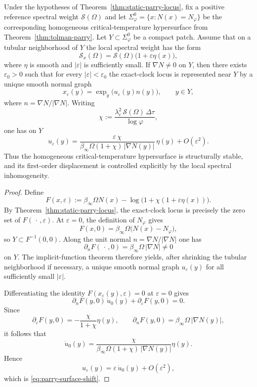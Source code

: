 \begin{theorem}\label{thm:parry-surface-stability}
Under the hypotheses of Theorem~\ref{thm:static-parry-locus}, fix a positive reference spectral weight $\mathcal S(\Omega)$ and let $\Sigma_\varphi^0=\{x:N(x)=N_\varphi\}$ be the corresponding homogeneous critical-temperature hypersurface from Theorem~\ref{thm:tolman-parry}. Let $Y\subset\Sigma_\varphi^0$ be a compact patch. Assume that on a tubular neighborhood of $Y$ the local spectral weight has the form
\[
\mathcal S_x(\Omega)
=
\mathcal S(\Omega)\bigl(1+\varepsilon\eta(x)\bigr),
\]
where $\eta$ is smooth and $|\varepsilon|$ is sufficiently small. If $\nabla N\neq 0$ on $Y$, then there exists $\varepsilon_0>0$ such that for every $|\varepsilon|<\varepsilon_0$ the exact-clock locus is represented near $Y$ by a unique smooth normal graph
\[
x_\varepsilon(y)=\exp_y\bigl(u_\varepsilon(y)n(y)\bigr),
\qquad
y\in Y,
\]
where $n=\nabla N/|\nabla N|$. Writing
\[
\chi
:=
\frac{\lambda_c^2\,\mathcal S(\Omega)\,\Delta\tau}{\log\varphi},
\]
one has on $Y$
\begin{equation}\label{eq:parry-surface-shift}
u_\varepsilon(y)
=
\frac{\varepsilon\,\chi}{\beta_\infty\Omega(1+\chi)\,|\nabla N(y)|}\,
\eta(y)
+
O(\varepsilon^2).
\end{equation}
Thus the homogeneous critical-temperature hypersurface is structurally stable, and its first-order displacement is controlled explicitly by the local spectral inhomogeneity.
\end{theorem}

\begin{proof}
Define
\[
F(x,\varepsilon)
:=
\beta_\infty\Omega N(x)
-
\log\!\bigl(1+\chi(1+\varepsilon\eta(x))\bigr).
\]
By Theorem~\ref{thm:static-parry-locus}, the exact-clock locus is precisely the zero set of $F(\,\cdot\,,\varepsilon)$. At $\varepsilon=0$, the definition of $N_\varphi$ gives
\[
F(x,0)
=
\beta_\infty\Omega\bigl(N(x)-N_\varphi\bigr),
\]
so $Y\subset F^{-1}(0,0)$. Along the unit normal $n=\nabla N/|\nabla N|$ one has
\[
\partial_nF(\,\cdot\,,0)
=
\beta_\infty\Omega\,|\nabla N|
\neq
0
\]
on $Y$. The implicit-function theorem therefore yields, after shrinking the tubular neighborhood if necessary, a unique smooth normal graph $u_\varepsilon(y)$ for all sufficiently small $|\varepsilon|$.

Differentiating the identity $F(x_\varepsilon(y),\varepsilon)=0$ at $\varepsilon=0$ gives
\[
\partial_nF(y,0)\,\dot u_0(y)
+
\partial_\varepsilon F(y,0)
=
0.
\]
Since
\[
\partial_\varepsilon F(y,0)
=
-\frac{\chi}{1+\chi}\eta(y),
\qquad
\partial_nF(y,0)
=
\beta_\infty\Omega\,|\nabla N(y)|,
\]
it follows that
\[
\dot u_0(y)
=
\frac{\chi}{\beta_\infty\Omega(1+\chi)\,|\nabla N(y)|}\eta(y).
\]
Hence
\[
u_\varepsilon(y)
=
\varepsilon\,\dot u_0(y)
+
O(\varepsilon^2),
\]
which is \eqref{eq:parry-surface-shift}.
\end{proof}

